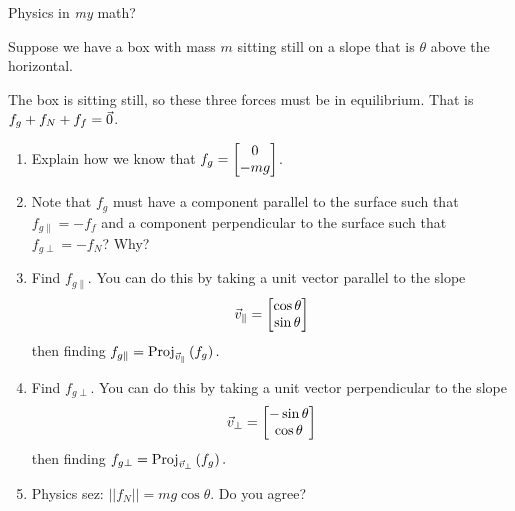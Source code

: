 \begin{exercise}{Physics in \textit{my} math?}

Suppose we have a box with mass $m$ sitting still on a slope that is $\theta$ above the horizontal.

\vspace{1em}
\begin{center}
\end{center}
\vspace{1em}

The box is sitting still, so these three forces must be in equilibrium. That is $f_g+f_N+f_f=\vzero$.
\vspace{1em}
\begin{enumerate}
\item Explain how we know that $f_g=\bmat{0\\-mg}$.
\vspace{1em}
\item Note that $f_g$ must have a component parallel to the surface such that $f_{g\parallel}=-f_f$ and a component perpendicular to the surface such that $f_{g\perp}=-f_N$? Why?
\vspace{1em}
\item Find $f_{g\parallel}$. You can do this by taking a unit vector parallel to the slope $$\vcv_{\parallel}=\bmat{\cos\theta\\ \sin\theta}$$ then finding $f_{g\parallel}=\proj{f_g}{\vcv_\parallel}.$
\vspace{1em}
\item Find $f_{g\perp}$. You can do this by taking a unit vector perpendicular to the slope $$\vcv_{\perp}=\bmat{-\sin\theta\\ \cos\theta}$$ then finding $f_{g\perp}=\proj{f_g}{\vcv_\perp}.$
\vspace{1em}
\item Physics sez: $||f_N||=mg\cos\theta$. Do you agree?
\end{enumerate}

\end{exercise}